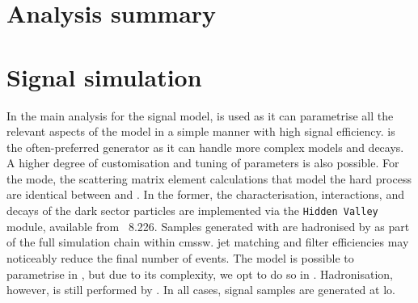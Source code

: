 




\section{Analysis summary}
\label{sec:svj_overview}





\section{Signal simulation}
\label{sec:signal_sim}

In the main analysis for the \schannel signal model, \PYTHIA is used as it can parametrise all the relevant aspects of the model in a simple manner with high signal efficiency. \MADGRAPH is the often-preferred generator as it can handle more complex models and decays. A higher degree of customisation and tuning of parameters is also possible. For the \schannel mode, the scattering matrix element calculations that model the hard process are identical between \PYTHIA and \MADGRAPH. In the former, the characterisation, interactions, and decays of the dark sector particles are implemented via the \texttt{Hidden Valley} module, available from \PYTHIA~8.226. Samples generated with \MADGRAPH are hadronised by \PYTHIA as part of the full simulation chain within \acrshort{cmssw}. \Gls{jet} matching and filter efficiencies may noticeably reduce the final number of events. The \tchannel model is possible to parametrise in \PYTHIA, but due to its complexity, we opt to do so in \MADGRAPH. Hadronisation, however, is still performed by \PYTHIA. In all cases, signal samples are generated at \acrfull{lo}.

